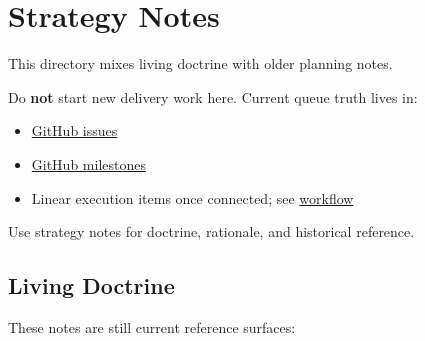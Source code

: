 \chapter{Strategy Notes}\label{record-030}

\smallskip

This directory mixes living doctrine with older planning notes.

Do \textbf{not} start new delivery work here. Current queue truth lives in:

\begin{itemize}
\tightlist
\item
  \href{https://github.com/flyingrobots/bijou/issues}{GitHub issues}
\item
  \href{https://github.com/flyingrobots/bijou/milestones}{GitHub milestones}
\item
  Linear execution items once connected; see \href{https://github.com/flyingrobots/bijou/blob/cbd70612140e7a450d764b3c7be1c6af878b99bc/docs/WORKFLOW.md}{workflow}
\end{itemize}

Use strategy notes for doctrine, rationale, and historical reference.

\section{Living Doctrine}\label{record-030-living-doctrine}

These notes are still current reference surfaces:

